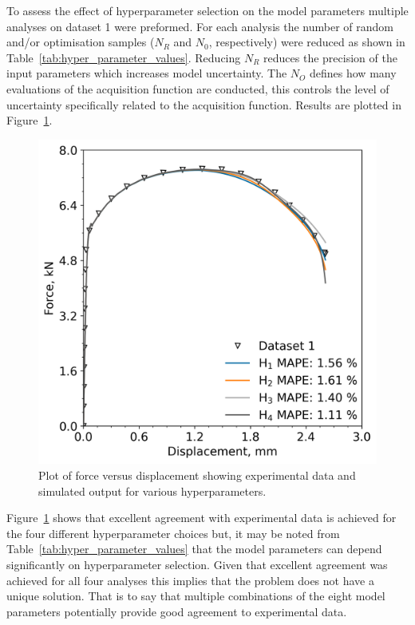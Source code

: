 \documentclass[preprint, review, 12pt]{elsarticle}
\begin{document}
	To assess the effect of hyperparameter selection on the model parameters multiple analyses on dataset 1 were preformed.
	For each analysis the number of random and/or optimisation samples ($N_R$ and $N_0$, respectively) were reduced as shown in Table~\ref{tab:hyper_parameter_values}.
	Reducing $N_R$ reduces the precision of the input parameters which increases model uncertainty.
	The $N_O$ defines how many evaluations of the acquisition function are conducted, this controls the level of uncertainty specifically related to the acquisition function.
	Results are plotted in Figure~\ref{fig:unique}.
	\begin{figure}[!htbp]
		\centering
		\includegraphics[width=\linewidth, height=0.4\textheight, keepaspectratio]{HYPERPARAMETERS}
		\caption{Plot of force versus displacement showing experimental data and simulated output for various hyperparameters.}
		\label{fig:unique}
	\end{figure}

	


	Figure~\ref{fig:unique} shows that excellent agreement with experimental data is achieved for the four different hyperparameter choices but, it may be noted from Table~\ref{tab:hyper_parameter_values} that the model parameters can depend significantly on hyperparameter selection.
	Given that excellent agreement was achieved for all four analyses this implies that the problem does not have a unique solution.
	That is to say that multiple combinations of the eight model parameters potentially provide good agreement to experimental data.
\end{document}
